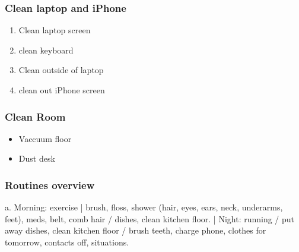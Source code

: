 \begin{frame}
\frametitle{Clean laptop and iPhone}
\begin{enumerate} 
\small \item \small Clean laptop screen 
\item \small clean keyboard 
\item \small Clean outside of laptop 
\item \small clean out iPhone screen 
\end{enumerate} 
\end{frame}

\begin{frame}
\frametitle{Clean Room} 
\begin{itemize} 
\item \tiny Vaccuum floor 
\item \tiny Dust desk 
\end{itemize} 
\end{frame}

\begin{frame}[label=routinesOverview]
\frametitle{Routines overview } 
{\small a. Morning: exercise | brush, floss, shower (hair, eyes, ears, neck,
underarms, feet), meds, belt, comb hair / dishes, clean kitchen
floor. | Night: running / put away dishes, clean kitchen floor /
brush teeth, charge phone, clothes for tomorrow, contacts off, situations. }
\end{frame} 

